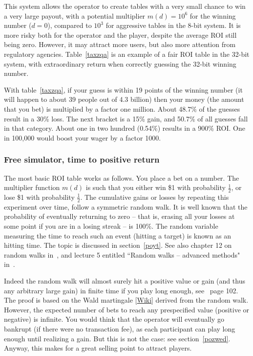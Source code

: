 \documentclass[oneside,10pt]{book}
\begin{document}
\noindent This system allows the operator to create tables with a very small chance to win a very large payout,
 with a potential multiplier $m(d)=10^6$ for the winning number ($d=0$), compared to $10^3$ for aggressive tables in the 8-bit system. It is more risky both for the operator and the player, despite the average ROI still being zero. However, it may attract more users, but also more attention from regulatory agencies. Table~\ref{taxzqa} is an example of a fair ROI table in
 the 32-bit system, with extraordinary return when correctly guessing the 32-bit winning number.

With table~\ref{taxzqa}, if your guess is within 19 points of the winning number (it will happen to about 39 people out of 4.3 billion) then your money (the amount that you bet)  is multiplied by a factor one million. About 48.7\% of the guesses result in a 30\% loss. The next bracket is a 15\% gain, and 50.7\% of all guesses fall in that category. About one in two hundred (0.54\%) results in a 900\% ROI. One in 100,000 would boost your wager by a factor 1000.

\subsubsection{Free simulator, time to positive return}

The most basic ROI table works as follows. You place a bet on a number.  The multiplier function $m(d)$ is such that
 you either win \$1 with probability $\frac{1}{2}$, or lose \$1 with probability $\frac{1}{2}$. The cumulative gains or losses
 by repeating this experiment over time, follow a \textcolor{index}{symmetric random walk}. It is well known that
 the probability of eventually returning to zero -- that is, erasing all your losses at some point  if you are in a losing streak -- is 100\%.
 The random variable measuring the time to reach such an event (hitting a target) is known as an \textcolor{index}{hitting time}. The topic is discussed in section~\ref{poyt}.
See also chapter 12 on random walks in~\cite{baslmou}, and lecture 5 entitled ``Random walks -- advanced methods" in~\cite{tex19ram}.

Indeed the random walk will almost surely hit a positive value or gain (and thus any arbitrary large gain)
 in finite time if you play long enough, see~\cite{martin91} page 102. The proof is based on the
\textcolor{index}{Wald martingale} [\href{https://en.wikipedia.org/wiki/Wald%27s_martingale}{Wiki}]  derived from the random walk. However, the expected number of bets to reach any prespecified value (positive or negative) is infinite.
You would think that the operator will eventually go bankrupt (if there were no transaction fee), as each participant can play long enough until realizing a gain. But this is not the case: see section~\ref{pozwed}. Anyway, this makes for a great selling point to attract players.
\end{document}
